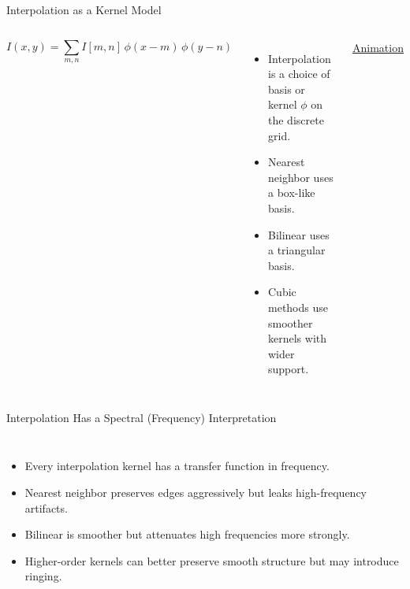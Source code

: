 \documentclass[aspectratio=169,10pt]{beamer}
\begin{document}
\begin{frame}{Interpolation as a Kernel Model}
\begin{columns}[T,onlytextwidth]
\[
I(x,y) = \sum_{m,n} I[m,n] \, \phi(x-m)\,\phi(y-n)
\]
\vspace{-0.6em}
\begin{itemize}
\item Interpolation is a choice of basis or kernel $\phi$ on the discrete grid.
\item Nearest neighbor uses a box-like basis.
\item Bilinear uses a triangular basis.
\item Cubic methods use smoother kernels with wider support.
\end{itemize}



\centering
{}

\href{https://www.youtube.com/watch?v=Xj129kA3Ci0}{\color{blue}Animation}

\end{columns}

\end{frame}

\begin{frame}{Interpolation Has a Spectral (Frequency) Interpretation}
\begin{columns}[T,onlytextwidth]
\begin{itemize}
\item Every interpolation kernel has a transfer function in frequency.
\item Nearest neighbor preserves edges aggressively but leaks high-frequency artifacts.
\item Bilinear is smoother but attenuates high frequencies more strongly.
\item Higher-order kernels can better preserve smooth structure but may introduce ringing.
\end{itemize}


\centering
{}
\end{columns}
\end{frame}
\end{document}
